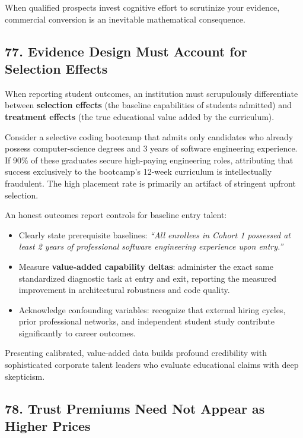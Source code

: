When qualified prospects invest cognitive effort to scrutinize your evidence, commercial conversion is an inevitable mathematical consequence.

\subsection*{77. Evidence Design Must Account for Selection Effects}

When reporting student outcomes, an institution must scrupulously differentiate between \textbf{selection effects} (the baseline capabilities of students admitted) and \textbf{treatment effects} (the true educational value added by the curriculum).

Consider a selective coding bootcamp that admits only candidates who already possess computer-science degrees and 3 years of software engineering experience. If 90\% of these graduates secure high-paying engineering roles, attributing that success exclusively to the bootcamp's 12-week curriculum is intellectually fraudulent. The high placement rate is primarily an artifact of stringent upfront selection.

An honest outcomes report controls for baseline entry talent:
\begin{itemize}
\item Clearly state prerequisite baselines: \emph{``All enrollees in Cohort 1 possessed at least 2 years of professional software engineering experience upon entry.''}
\item Measure \textbf{value-added capability deltas}: administer the exact same standardized diagnostic task at entry and exit, reporting the measured improvement in architectural robustness and code quality.
\item Acknowledge confounding variables: recognize that external hiring cycles, prior professional networks, and independent student study contribute significantly to career outcomes.
\end{itemize}

Presenting calibrated, value-added data builds profound credibility with sophisticated corporate talent leaders who evaluate educational claims with deep skepticism.

\subsection*{78. Trust Premiums Need Not Appear as Higher Prices}

